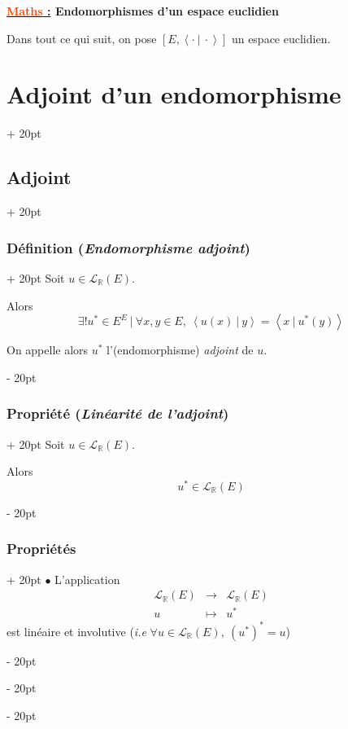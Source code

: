 \documentclass[a4paper, 12pt, twoside]{article}
\newcommand{\Emph}{\textcolor{ff4500}}
\newcommand{\R}{\mathbb{R}} %
\newcommand{\lr}[1]{\left( #1 \right)}
\newcommand{\lrangle}[1]{\left\langle #1 \right\rangle}
\newcommand{\ps}[2]{\lrangle{#1\ |\ #2}}
\newcommand{\ind}[1][20pt]{\advance\leftskip + #1}
\newcommand{\deind}[1][20pt]{\advance\leftskip - #1}
\newenvironment{indt}[2][20pt]{#2 \par \ind[#1]}{\par \deind} %
\newcommand{\thetitle}[2]{\begin{center}\textbf{{\LARGE \underline{\Emph{#1} :}} {\Large #2}}\end{center}}
\begin{document}
    
    \thetitle{Maths}{Endomorphismes d'un espace euclidien}
    
    \tableofcontents
    \newpage
    
    Dans tout ce qui suit, on pose $[E, \ps \cdot \cdot]$ un espace euclidien.

    \begin{indt}{\section{Adjoint d'un endomorphisme}}
        \begin{indt}{\subsection{Adjoint}}
            \begin{indt}{\subsubsection{Définition (\textit{Endomorphisme adjoint})}}
                Soit $u \in \mathcal L_\R(E)$.
            
                Alors
                \[
                    \exists ! u^* \in E^E\ |\ \forall x, y \in E,\ \ps{u(x)}{y} = \ps{x}{u^*(y)}
                \]
            
                On appelle alors $u^*$ l'(endomorphisme) \emph{adjoint} de $u$.
            \end{indt}
            
            \vspace{12pt}
            
            \begin{indt}{\subsubsection{Propriété (\textit{Linéarité de l'adjoint})}}
                Soit $u \in \mathcal L_\R(E)$.
            
                Alors
                \[
                    u^* \in \mathcal L_\R(E)
                \]
            \end{indt}
            
            \vspace{12pt}
            
            \begin{indt}{\subsubsection{Propriétés}}
                $\bullet$ L'application
                \[
                    \begin{array}{ccc}
                        \mathcal L_\R(E) & \longrightarrow & \mathcal L_\R(E)
                        \\
                        u & \longmapsto & u^*
                    \end{array}
                \]
                est linéaire et involutive (\textit{i.e} $\forall u \in \mathcal L_\R(E),\ \lr{u^*}^* = u$)
            

\end{indt}
\end{indt}
\end{indt}
\end{document}
